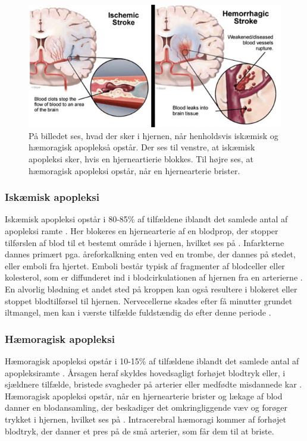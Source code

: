 \begin{figure}[H]
	\centering
	\includegraphics[scale=0.8]{figures/bProblemanalyse/haemoragisk_og_iskaemisk.png}
	\caption{På billedet ses, hvad der sker i hjernen, når henholdsvis iskæmisk og hæmoragisk apoplekså opstår. Der ses til venstre, at iskæmisk apopleksi sker, hvis en hjerneartierie blokkes. Til højre ses, at hæmoragisk apopleksi opstår, når en hjernearterie brister.\cite{Ritter2015}}
	\label{haem-isk}
\end{figure}

\subsubsection{Iskæmisk apopleksi}
Iskæmisk apopleksi opstår i 80-85\% af tilfældene iblandt det samlede antal af apopleksi ramte \cite{Sundhed.dk2014}. Her blokeres en hjernearterie af en blodprop, der stopper tilførslen af blod til et bestemt område i hjernen, hvilket ses på . Infarkterne dannes primært pga. åreforkalkning enten ved en trombe, der dannes på stedet, eller emboli fra hjertet. \cite{Schulze2011} Emboli består typisk af fragmenter af blodceller eller kolesterol, som er diffunderet ind i blodcirkulationen af hjernen fra en arterierne \cite{Academic2015a}. En alvorlig blødning et andet sted på kroppen kan også resultere i blokeret eller stoppet blodtilførsel til hjernen. \cite{Hjernesagen2015a} Nervecellerne skades efter få minutter grundet iltmangel, men kan i værste tilfælde fuldstændig dø efter denne periode \cite{Schulze2011,Giraldo2015}.%

\subsubsection{Hæmoragisk apopleksi}
Hæmoragisk apopleksi opstår i 10-15\% af tilfældene iblandt det samlede antal af apopleksiramte \cite{Sundhed.dk2014}. Årsagen heraf skyldes hovedsagligt forhøjet blodtryk eller, i sjældnere tilfælde, bristede svagheder på arterier eller medfødte misdannede kar \cite{Schulze2011}. Hæmoragisk apopleksi opstår, når en hjernearterie brister og lækage af blod danner en blodansamling, der beskadiger det omkringliggende væv og forøger trykket i hjernen, hvilket ses på . Intracerebral hæmoragi kommer af forhøjet blodtryk, der danner et pres på de små arterier, som får dem til at briste. \cite{Caplan2006}

